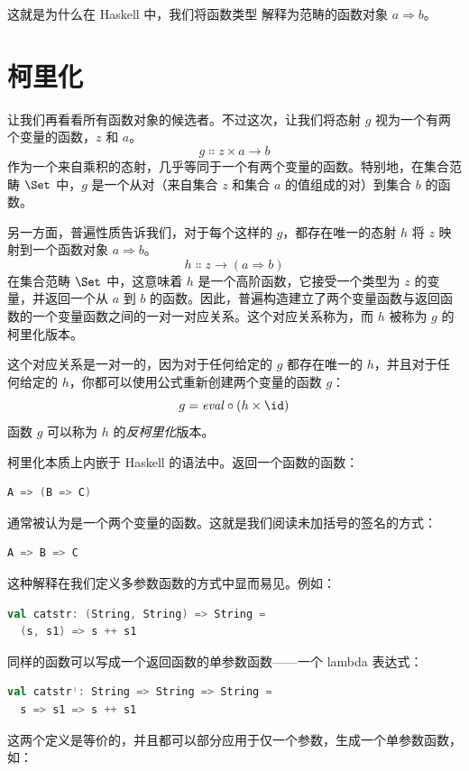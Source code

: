这就是为什么在 Haskell 中，我们将函数类型  解释为范畴的函数对象 $a \Rightarrow b$。

\section{柯里化}

让我们再看看所有函数对象的候选者。不过这次，让我们将态射 $g$ 视为一个有两个变量的函数，$z$ 和 $a$。
\[g \Colon z \times a \to b\]
作为一个来自乘积的态射，几乎等同于一个有两个变量的函数。特别地，在集合范畴 $\Set$ 中，$g$ 是一个从对（来自集合 $z$ 和集合 $a$ 的值组成的对）到集合 $b$ 的函数。

另一方面，普遍性质告诉我们，对于每个这样的 $g$，都存在唯一的态射 $h$ 将 $z$ 映射到一个函数对象 $a \Rightarrow b$。
\[h \Colon z \to (a \Rightarrow b)\]
在集合范畴 $\Set$ 中，这意味着 $h$ 是一个高阶函数，它接受一个类型为 $z$ 的变量，并返回一个从 $a$ 到 $b$ 的函数。因此，普遍构造建立了两个变量函数与返回函数的一个变量函数之间的一对一对应关系。这个对应关系称为，而 $h$ 被称为 $g$ 的柯里化版本。

这个对应关系是一对一的，因为对于任何给定的 $g$ 都存在唯一的 $h$，并且对于任何给定的 $h$，你都可以使用公式重新创建两个变量的函数 $g$：
\[g = \mathit{eval} \circ (h \times \id)\]
函数 $g$ 可以称为 $h$ 的\emph{反柯里化}版本。

柯里化本质上内嵌于 Haskell 的语法中。返回一个函数的函数：

\begin{lstlisting}[language=Scala]
A => (B => C)
\end{lstlisting}
通常被认为是一个两个变量的函数。这就是我们阅读未加括号的签名的方式：

\begin{lstlisting}[language=Scala]
A => B => C
\end{lstlisting}
这种解释在我们定义多参数函数的方式中显而易见。例如：

\begin{lstlisting}[language=Scala]
val catstr: (String, String) => String =
  (s, s1) => s ++ s1
\end{lstlisting}
同样的函数可以写成一个返回函数的单参数函数——一个 lambda 表达式：

\begin{lstlisting}[language=Scala]
val catstrᛌ: String => String => String = 
  s => s1 => s ++ s1
\end{lstlisting}
这两个定义是等价的，并且都可以部分应用于仅一个参数，生成一个单参数函数，如：

